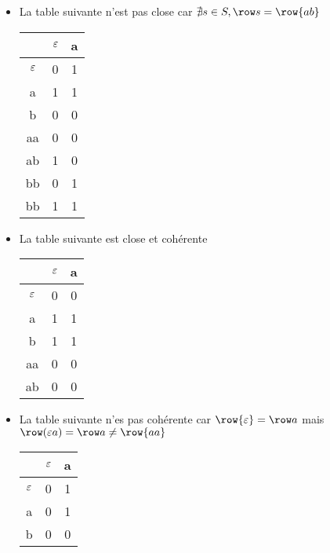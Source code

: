 \begin{exemple} \label{ex:tables}

	\begin{itemize}
		\item La table suivante n'est pas close car $\nexists s \in S, \row s = \row {ab}$
		      \begin{center}
			      \begin{tabular}{c|c|c}
				                 & $\varepsilon$ & a \\ \hline
				      $\varepsilon$ & 0          & 1 \\
				      a          & 1          & 1 \\
				      b          & 0          & 0 \\ \hline

				      aa         & 0          & 0 \\
				      ab         & 1          & 0 \\
				      bb         & 0          & 1 \\
				      bb         & 1          & 1 \\
			      \end{tabular}
		      \end{center}

		\item La table suivante est close et cohérente
		      \begin{center}
			      \begin{tabular}{c|c|c}
				                 & $\varepsilon$ & a \\ \hline
				      $\varepsilon$ & 0          & 0 \\
				      a          & 1          & 1 \\ \hline

				      b          & 1          & 1 \\
				      aa         & 0          & 0 \\
				      ab         & 0          & 0 \\
			      \end{tabular}
		      \end{center}
		\item La table suivante n'es pas cohérente car $\row {\motvide} = \row a$ mais
		      $\row (\motvide a) = \row a \neq \row {aa}$

		      \begin{center}
			      \begin{tabular}{c|c|c}
				                 & $\varepsilon$ & a \\ \hline
				      $\varepsilon$ & 0          & 1 \\
				      a          & 0          & 1 \\
				      b          & 0          & 0 \\ \hline


\end{tabular}
\end{center}
\end{itemize}
\end{exemple}
